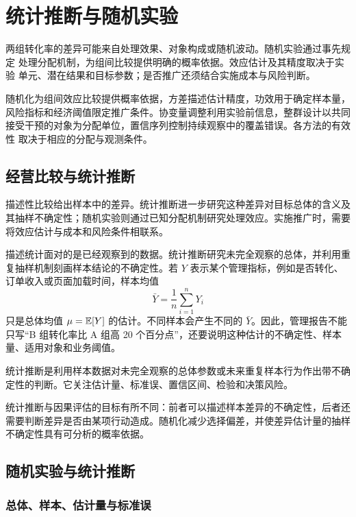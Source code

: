 \chapter{统计推断与随机实验}
\label{ch:week06-ab-testing}

两组转化率的差异可能来自处理效果、对象构成或随机波动。随机实验通过事先规定
处理分配机制，为组间比较提供明确的概率依据。效应估计及其精度取决于实验
单元、潜在结果和目标参数；是否推广还须结合实施成本与风险判断。

随机化为组间效应比较提供概率依据，方差描述估计精度，功效用于确定样本量，
风险指标和经济阈值限定推广条件。协变量调整利用实验前信息，整群设计以共同
接受干预的对象为分配单位，置信序列控制持续观察中的覆盖错误。各方法的有效性
取决于相应的分配与观测条件。

\section{经营比较与统计推断}

描述性比较给出样本中的差异。统计推断进一步研究这种差异对目标总体的含义及其抽样不确定性；随机实验则通过已知分配机制研究处理效应。实施推广时，需要将效应估计与成本和风险条件相联系。

描述统计面对的是已经观察到的数据。统计推断研究未完全观察的总体，并利用重复抽样机制刻画样本结论的不确定性。若 \(Y\) 表示某个管理指标，例如是否转化、订单收入或页面加载时间，样本均值
\[
  \bar Y=\frac{1}{n}\sum_{i=1}^n Y_i
\]
只是总体均值 \(\mu=\mathbb E[Y]\) 的估计。不同样本会产生不同的 \(\bar Y\)。因此，管理报告不能只写“B 组转化率比 A 组高 20 个百分点”，还要说明这种估计的不确定性、样本量、适用对象和业务阈值。

\begin{definition}[统计推断]
统计推断是利用样本数据对未完全观察的总体参数或未来重复样本行为作出带不确定性的判断。它关注估计量、标准误、置信区间、检验和决策风险。
\end{definition}

统计推断与因果评估的目标有所不同：前者可以描述样本差异的不确定性，后者还需要判断差异是否由某项行动造成。随机化减少选择偏差，并使差异估计量的抽样不确定性具有可分析的概率依据。

\section{随机实验与统计推断}
\subsection{总体、样本、估计量与标准误}

